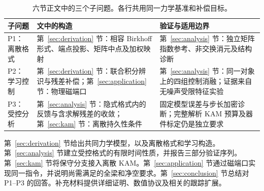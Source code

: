 \begin{table}[t]
\centering
\caption{六节正文中的三个子问题。各行共用同一力学基准和补偿目标。}
\label{tab:roadmap}
\begin{tabularx}{\textwidth}{p{}YY}
\toprule
子问题 & 文中的构造 & 验证与适用边界\\
\midrule
P1：离散格式 & 第~\ref{sec:derivation} 节：相容 Birkhoff 形式、端点投影、矩阵中点及加权映射 & 第~\ref{sec:analysis} 节：独立矩阵指数参考、非交换消元及结构诊断\\
P2：学习控制 & 第~\ref{sec:derivation} 节：联合积分辨识与残差补偿；第~\ref{sec:application} 节：物理磁端口 & 第~\ref{sec:analysis} 节：同一对象上的四组控制消融；证据来自无噪声受限特征实验\\
P3：受控分析 & 第~\ref{sec:analysis} 节：隐式格式内的反馈与含求解残差的收敛；第~\ref{sec:kam} 节：离散持久性条件 & 固定模型误差与步长加密诊断；完整解析 KAM 预算及器件标定仍是独立要求\\
\bottomrule
\end{tabularx}
\end{table}

第~\ref{sec:derivation} 节给出共同力学模型，以及离散格式和学习构造。第~\ref{sec:analysis} 节建立受控格式的有限时间性质，并报告三部分验证序列。第~\ref{sec:kam} 节将保守分支接入离散 KAM。第~\ref{sec:application} 节通过磁端口实现同一指令，并说明尚需满足的全梁和净空要求。第~\ref{sec:conclusion} 节总结对 P1--P3 的回答。补充材料提供详细证明、数值协议及相关的跟踪扩展。
